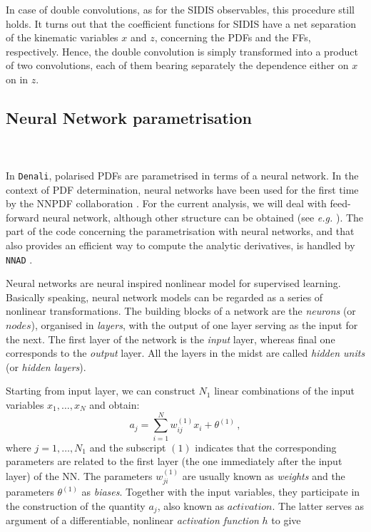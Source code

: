 In case of double convolutions, as for the SIDIS observables, this procedure still holds. It turns out that the coefficient functions for SIDIS have a net separation of the kinematic variables $x$ and $z$, concerning the PDFs and the FFs, respectively. Hence, the double convolution is simply transformed into a product of two convolutions, each of them bearing separately the dependence either on $x$ on in $z$. 


\subsection{Neural Network parametrisation}
\label{sec:NN}

\\
\\
In \texttt{Denali}, polarised PDFs are parametrised in terms of a neural network. In the context of PDF determination, neural networks have been used for the first time by the NNPDF collaboration \cite{Forte:2002fg}. For the current analysis, we will deal with feed-forward neural network, although other structure can be obtained (see \textit{e.g.} \cite{Bishop}). The part of the code concerning the parametrisation with neural networks, and that also provides an efficient way to compute the analytic derivatives, is handled by \texttt{NNAD} \cite*{AbdulKhalek:2020uza}.\par
Neural networks are neural inspired nonlinear model for supervised learning. Basically speaking, neural network models can be regarded as a series of nonlinear transformations. The building blocks of a network are the \textit{neurons} (or $\textit{nodes}$), organised in \textit{layers}, with the output of one layer serving as the input for the next. The first layer of the network is the \textit{input} layer, whereas final one corresponds to the \textit{output} layer. All the layers in the midst are called \textit{hidden units} (or \textit{hidden layers}).\par
Starting from input layer, we can construct $N_1$ linear combinations of the input variables $x_1, \dots, x_N$ and obtain:
\begin{equation}
  a_j = \sum_{i=1}^{N} w_{ij}^{(1)} x_i + \theta^{(1)}\,,
  \label{eq:activation}
\end{equation}
where $j=1,\dots,N_1$ and the subscript $(1)$ indicates that the corresponding parameters are related to the first layer (the one immediately after the input layer) of the NN. The parameters $w^{(1)}_{ji}$ are usually known as \textit{weights} and the parameters $\theta^{(1)}$ as \textit{biases}. Together with the input variables, they participate in the construction of the quantity $a_j$, also known as $activation$. The latter serves as argument of a differentiable, nonlinear \textit{activation function} $h$ to give
